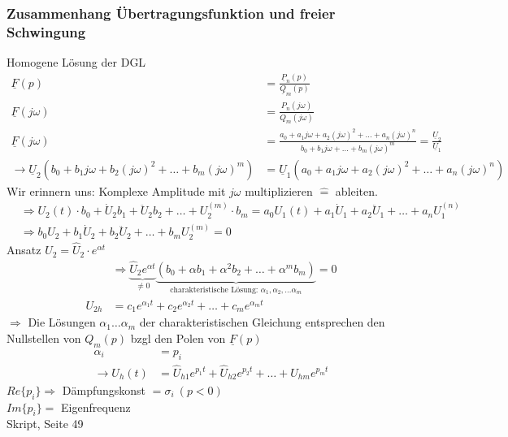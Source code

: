\subsubsection{Zusammenhang Übertragungsfunktion und freier Schwingung}
Homogene Lösung der DGL\\
\begin{align}
	\underline{F}(p)&=\frac{\underline{P}_n(p)}{\underline{Q}_m(p)}\nonumber\\
	\underline{F}(j\omega)&=\frac{P_n(j\omega)}{Q_m(j\omega)}\nonumber\\
	\underline{F}(j\omega)&=\frac{a_0+a_1j\omega+a_2(j\omega)^2+\ldots+a_n(j\omega)^n}{b_0+b_1j\omega+\ldots+b_m(j\omega)^m}=\frac{\underline{U}_2}{\underline{U}_1}\nonumber\\
	\rightarrow
\underline{U}_2(b_0+b_1j\omega+b_2(j\omega)^2+\ldots+b_m(j\omega)^m)&=\underline{U}_1(a_0+a_1j\omega+a_2(j\omega)^2+\ldots+a_n(j\omega)^n)\nonumber
\end{align}
Wir erinnern uns: Komplexe Amplitude mit $j\omega$ multiplizieren
$\widehat{=}$ ableiten.\\
\begin{align}
	&\Rightarrow U_2(t)\cdot b_0 + \dot{U}_2b_1 +
	\ddot{U}_2b_2+\ldots+U_2^{(m)}\cdot
	b_m=a_0U_1(t)+a_1\dot{U}_1+a_2\ddot{U}_1+\ldots+a_nU_1^{(n)}\nonumber\\
	&\Rightarrow b_0U_2+b_1\dot{U}_2+b_2\ddot{U}_2+\ldots+b_mU_2^{(m)}=0\nonumber
\end{align}
Ansatz $U_2=\hat{U}_2\cdot e^{\alpha t}$\\
\begin{align}
	&\Rightarrow \underbrace{\hat{U}_2e^{\alpha t}}_{\neq 0}\underbrace{(b_0+\alpha
b_1+\alpha^2b_2+\ldots+\alpha^mb_m)}_{\text{charakteristische
Lösung: }\alpha_1, \alpha_2, \ldots \alpha_m}=0\nonumber\\
	U_{2h}&=c_1e^{\alpha_1t}+c_2e^{\alpha_2t}+\ldots+c_me^{\alpha_mt}\nonumber
\end{align}
$\Rightarrow$ Die Lösungen $\alpha_1\ldots\alpha_m$ der charakteristischen
Gleichung entsprechen den Nullstellen von $Q_m(p)$ bzgl den Polen von
$\underline{F}(p)$\\
\begin{align}
\alpha_i&=p_i\nonumber\\
\rightarrow
U_h(t)&=\hat{U}_{h1}e^{p_1t}+\hat{U}_{h2}e^{p_2t}+\ldots+U_{hm}e^{p_mt}\nonumber
\end{align}
$Re\{p_i\} \Rightarrow $ Dämpfungskonst $=\sigma_i\ (p<0)$\\
$Im\{p_i\}=$
Eigenfrequenz\\
Skript, Seite 49\\


